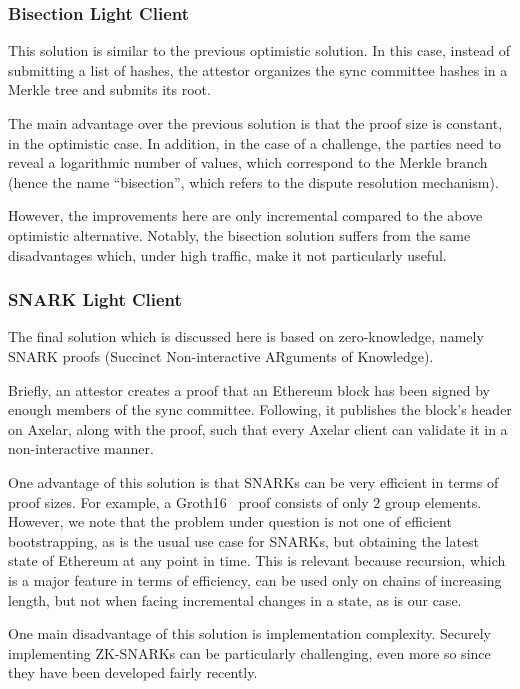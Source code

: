 \subsubsection{Bisection Light Client}

This solution is similar to the previous optimistic solution. In this case,
instead of submitting a list of hashes, the attestor organizes the sync
committee hashes in a Merkle tree and submits its root.

The main advantage over the previous solution is that the proof size is
constant, in the optimistic case. In addition, in the case of a challenge, the
parties need to reveal a logarithmic number of values, which correspond to the
Merkle branch (hence the name ``bisection'', which refers to the dispute
resolution mechanism).

However, the improvements here are only incremental compared to the above
optimistic alternative. Notably, the bisection solution suffers from the same
disadvantages which, under high traffic, make it not particularly useful.

\subsubsection{SNARK Light Client}

The final solution which is discussed here is based on zero-knowledge, namely
SNARK proofs (Succinct Non-interactive ARguments of Knowledge).

Briefly, an attestor creates a proof that an Ethereum block has been signed by
enough members of the sync committee. Following, it publishes the block's
header on Axelar, along with the proof, such that every Axelar client can
validate it in a non-interactive manner.

One advantage of this solution is that SNARKs can be very efficient in terms of
proof sizes. For example, a Groth16~\cite{EC:Groth16} proof consists of only
$2$ group elements. However, we note that the problem under question is not one
of efficient bootstrapping, as is the usual use case for SNARKs, but obtaining
the latest state of Ethereum at any point in time. This is relevant because
recursion, which is a major feature in terms of efficiency, can be used only on
chains of increasing length, but not when facing incremental changes in a
state, as is our case.

One main disadvantage of this solution is implementation complexity. Securely
implementing ZK-SNARKs can be particularly challenging, even more so since they
have been developed fairly recently.

